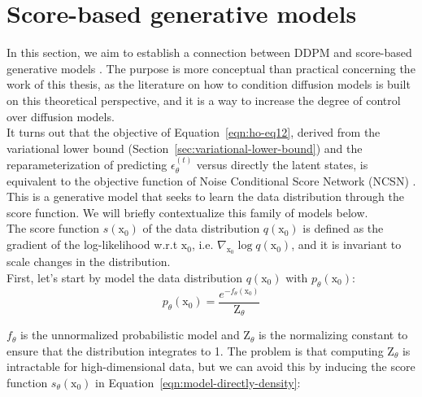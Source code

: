 \section{Score-based generative models}\label{sec:ddpm-as-score}


In this section, we aim to establish a connection between DDPM and score-based generative models \citep{song2020generative}\citep{song2020improved}\citep{song2021scorebased}. The purpose is more conceptual than practical concerning the work of this thesis, as the literature on how to condition diffusion models is built on this theoretical perspective, and it is a way to increase the degree of control over diffusion models. \\

\noindent It turns out that the objective of Equation~\ref{eqn:ho-eq12}, derived from the variational lower bound (Section~\ref{sec:variational-lower-bound}) and the reparameterization of predicting $\epsilon_{\theta}^{(t)}$ versus directly the latent states, is equivalent to the objective function of Noise Conditional Score Network (NCSN) \citep{song2020improved}. This is a generative model that seeks to learn the data distribution through the score function. We will briefly contextualize this family of models below. \\

\noindent The score function $s(\mathrm{x}_{0})$ of the data distribution $q(\mathrm{x}_{0})$ is defined as the gradient of the log-likelihood w.r.t $\mathrm{x}_{0}$, i.e. $\nabla_{\mathrm{x}_{0}}\log q(\mathrm{x}_{0})$, and it is invariant to scale changes in the distribution. \\

\noindent First, let's start by model the data distribution $q(\mathrm{x}_{0})$ with $p_{\theta}(\mathrm{x}_{0})$:
\begin{equation}\label{eqn:model-directly-density}
    p_{\theta}(\mathrm{x}_{0}) = \frac{e^{-f_{\theta}(\mathrm{x}_{0})}}{\mathrm{Z}_{\theta}} 
\end{equation}

\noindent $f_{\theta}$ is the unnormalized probabilistic model and $\mathrm{Z}_{\theta}$ is the normalizing constant to ensure that the distribution integrates to 1.  The problem is that computing $\mathrm{Z}_{\theta}$ is intractable for high-dimensional data, but we can avoid this by inducing the score function $s_{\theta}(\mathrm{x}_{0})$ in Equation~\ref{eqn:model-directly-density}: \\

